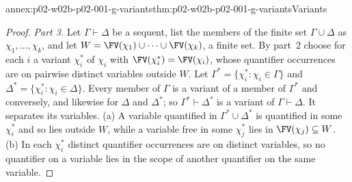 \begin{annexitem}{annex:p02-w02b-p02-001-g-variants}{thm:p02-w02b-p02-001-g-variants}{Variants}
\begin{proof}
\emph{Part 3.}  Let \(\Gamma\vdash\Delta\) be a sequent, list the members of
the finite set \(\Gamma\cup\Delta\) as \(\chi_1,\ldots,\chi_k\), and let
\(W=\FV(\chi_1)\cup\cdots\cup\FV(\chi_k)\), a finite set.  By part~2
choose for each \(i\) a variant \(\chi_i^{*}\) of \(\chi_i\) with
\(\FV(\chi_i^{*})=\FV(\chi_i)\), whose quantifier occurrences are on pairwise
distinct variables outside \(W\).  Let
\(\Gamma^{*}=\{\chi_i^{*}:\chi_i\in\Gamma\}\) and
\(\Delta^{*}=\{\chi_i^{*}:\chi_i\in\Delta\}\).  Every member of \(\Gamma\) is
a variant of a member of \(\Gamma^{*}\) and conversely, and likewise for
\(\Delta\) and \(\Delta^{*}\); so \(\Gamma^{*}\vdash\Delta^{*}\) is a variant
of \(\Gamma\vdash\Delta\).  It separates its variables.  (a) A variable
quantified in \(\Gamma^{*}\cup\Delta^{*}\) is quantified in some
\(\chi_i^{*}\) and so lies outside \(W\), while a variable free in some
\(\chi_j^{*}\) lies in \(\FV(\chi_j)\subseteq W\).  (b) In each
\(\chi_i^{*}\) distinct quantifier occurrences are on distinct variables,
so no quantifier on a variable lies in the scope of another quantifier on
the same variable.
\end{proof}
\end{annexitem}

